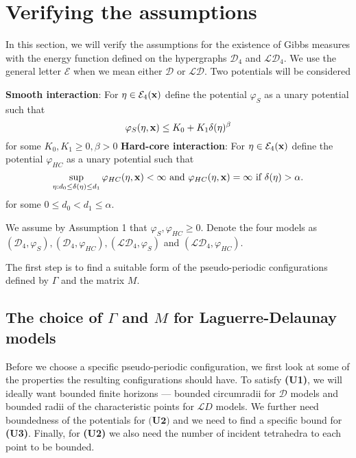\section{Verifying the assumptions}\label{sec:verifyassumptions}
In this section, we will verify the assumptions for the existence of Gibbs measures with the energy function defined on the hypergraphs $\mathcal D_4$ and $\mathcal {LD}_4$. We use the general letter $\mathcal E$ when we mean either $\mathcal D$ or $\mathcal {LD}$. Two potentials will be considered

\noindent \textbf{Smooth interaction}:  For $\eta\in\mathcal E_4({\mathbf{x}})$ define the potential $\varphi_S$ as a unary potential such that
$$\varphi_S(\eta,{\mathbf{x}}) \leq K_0 + K_1 \delta(\eta)^{\beta}$$
for some $K_0,K_1 \geq 0, \beta >0$\newline
\textbf{Hard-core interaction}: For $\eta\in\mathcal E_4({\mathbf{x}})$ define the potential $\varphi_{HC}$ as a unary potential such that
$$\sup_{\eta: d_0 \leq \delta(\eta) \leq d_1} \varphi_{HC}(\eta,{\mathbf{x}})  < \infty \text{ and } \varphi_{HC}(\eta,{\mathbf{x}})=\infty \text{ if } \delta(\eta)>\alpha.$$ 
for some $0\leq d_0 < d_1 \leq \alpha$. 

\noindent We assume by Assumption 1 that $\varphi_S,\varphi_{HC}\geq 0$. Denote the four models as $(\mathcal D_4,\varphi_{S}),(\mathcal D_4,\varphi_{HC}),(\mathcal {LD}_4,\varphi_{S})$ and $(\mathcal {LD}_4, \varphi_{HC})$. \newline

The first step is to find a suitable form of the pseudo-periodic configurations defined by $\Gamma$ and the matrix $M$. 

\subsection{The choice of $\Gamma$ and $M$ for Laguerre-Delaunay models}\label{sec:MGamma}
Before we choose a specific pseudo-periodic configuration, we first look at some of the properties the resulting configurations should have. To satisfy \textbf{(U1)}, we will ideally want bounded finite horizons --- bounded circumradii for $\mathcal D$ models and bounded radii of the characteristic points for $\mathcal LD$ models. We further need boundedness of the potentials for $\textbf{(U2)}$ and we need to find a specific bound for \textbf{(U3)}. Finally, for \textbf{(U2)} we also need the number of incident tetrahedra to each point to be bounded.

